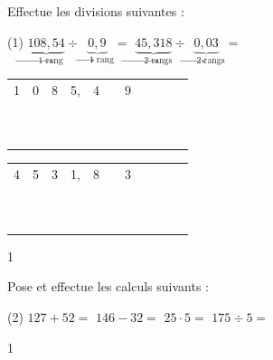 \documentclass[a4paper,11pt]{report}
\begin{document}
\begin{exop}{
Effectue les divisions suivantes :
\begin{tasks}(1)
\task $\underbrace{108,54}_{\rightarrow\mbox{1 rang}} \div \underbrace{0,9}_{\rightarrow\mbox{1 rang}}=$
\task $\underbrace{45,318}_{\rightarrow\mbox{2 rangs}} \div \underbrace{0,03}_{\rightarrow\mbox{2 rangs}}=$

\end{tasks}

\bigskip

\begin{minipage}{0,45\linewidth}
\begin{tabular}{cccccc|ccccc}
1&0&8&5,&4 & &9 & & & & \\\cline{7-11}
& & & & & & & & & & \\
& & & & & & & & & & \\
& & & & & & & & & & \\
& & & & & & & & & & \\
& & & & & & & & & & \\
& & & & & & & & & & \\
& & & & & & & & & & \\
& & & & & & & & & & \\
& & & & & & & & & & \\
& & & & & & & & & & \\
\end{tabular}
\end{minipage} \hfill
\begin{minipage}{0,45\linewidth}
\begin{tabular}{cccccc|ccccc}
4&5&3&1,&8 & &3 & & & & \\\cline{7-11}
& & & & & & & & & & \\
& & & & & & & & & & \\
& & & & & & & & & & \\
& & & & & & & & & & \\
& & & & & & & & & & \\
& & & & & & & & & & \\
& & & & & & & & & & \\
& & & & & & & & & & \\
& & & & & & & & & & \\
& & & & & & & & & & \\
\end{tabular}
\end{minipage}
}{1}
\end{exop}


\begin{exo}{
Pose et effectue les calculs suivants :
\begin{tasks}[after-item-skip = 0.4em, after-skip=-0.5em](2)
\task $127+52 =$
\task $146-32=$
\task $25\cdot 5 =$
\task $175 \div 5 =$
\end{tasks}
}{1}\end{exo}
\end{document}
